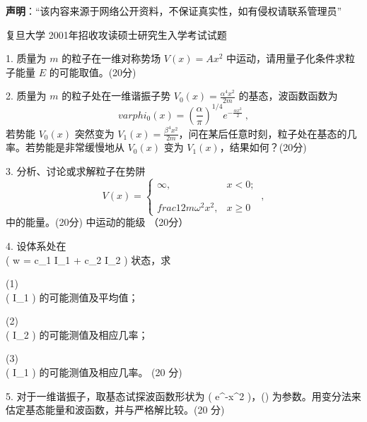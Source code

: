 
\textbf{声明}：“该内容来源于网络公开资料，不保证真实性，如有侵权请联系管理员”

复旦大学 2001年招收攻读硕士研究生入学考试试题

1. 质量为 $m$ 的粒子在一维对称势场 $V(x) = Ax^2$ 中运动，请用量子化条件求粒子能量 $E$ 的可能取值。(20分)

2. 质量为 $m$ 的粒子处在一维谐振子势 $V_0(x) = \frac{\alpha^4 x^2}{2m}$ 的基态，波函数函数为
$$ varphi_0(x) = \left(\frac{\alpha}{\pi}\right)^{1/4} e^{-\frac{\alpha x^2}{2}}~,$$ 
若势能 $V_0(x)$ 突然变为 $V_1(x) = \frac{\beta^4 x^2}{2m}$，问在某后任意时刻，粒子处在基态的几率。若势能是非常缓慢地从 $V_0(x)$ 变为 $V_1(x)$，结果如何？(20分)

3. 分析、讨论或求解粒子在势阱
$$  V(x) = \begin{cases} \infty, & x < 0; \\\\ \\frac{1}{2} m \omega^2 x^2, & x \geq 0 \end{cases}~,$$ 
中的能量。(20分)
中运动的能级 （20分）

4. 设体系处在 \\( w = c_1 I_1 + c_2 I_2 ) 状态，求

(1) \\( I_1 ) 的可能测值及平均值；

(2) \\( I_2 ) 的可能测值及相应几率；

(3) \\( I_1 ) 的可能测值及相应几率。 (20 分)

5. 对于一维谐振子，取基态试探波函数形状为 ( e^{-\lambda x^2} )，(\lambda) 为参数。用变分法来
    估定基态能量和波函数，并与严格解比较。(20 分)
